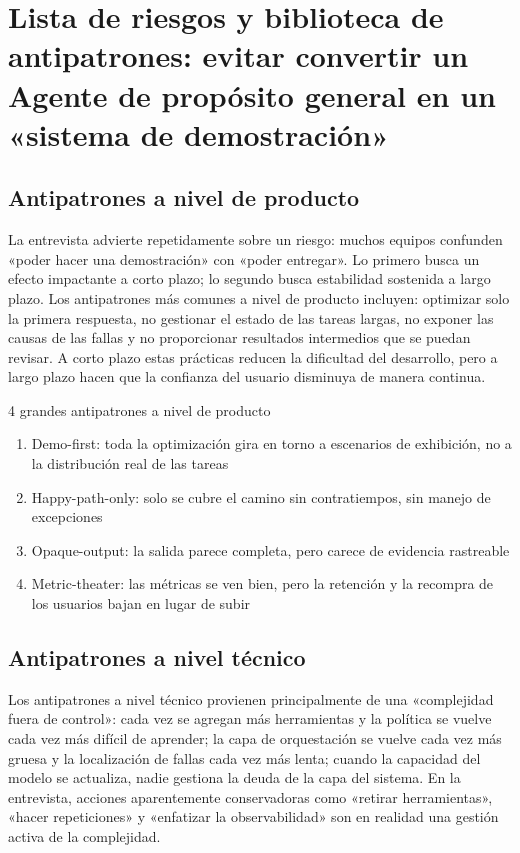 \section{Lista de riesgos y biblioteca de antipatrones: evitar convertir un Agente de propósito general en un «sistema de demostración»}

\subsection{Antipatrones a nivel de producto}

La entrevista advierte repetidamente sobre un riesgo: muchos equipos confunden «poder hacer una demostración» con «poder entregar». Lo primero busca un efecto impactante a corto plazo; lo segundo busca estabilidad sostenida a largo plazo. Los antipatrones más comunes a nivel de producto incluyen: optimizar solo la primera respuesta, no gestionar el estado de las tareas largas, no exponer las causas de las fallas y no proporcionar resultados intermedios que se puedan revisar. A corto plazo estas prácticas reducen la dificultad del desarrollo, pero a largo plazo hacen que la confianza del usuario disminuya de manera continua.

\begin{warningbox}{4 grandes antipatrones a nivel de producto}
\begin{enumerate}
    \item Demo-first: toda la optimización gira en torno a escenarios de exhibición, no a la distribución real de las tareas
    \item Happy-path-only: solo se cubre el camino sin contratiempos, sin manejo de excepciones
    \item Opaque-output: la salida parece completa, pero carece de evidencia rastreable
    \item Metric-theater: las métricas se ven bien, pero la retención y la recompra de los usuarios bajan en lugar de subir
\end{enumerate}
\end{warningbox}

\subsection{Antipatrones a nivel técnico}

Los antipatrones a nivel técnico provienen principalmente de una «complejidad fuera de control»: cada vez se agregan más herramientas y la política se vuelve cada vez más difícil de aprender; la capa de orquestación se vuelve cada vez más gruesa y la localización de fallas cada vez más lenta; cuando la capacidad del modelo se actualiza, nadie gestiona la deuda de la capa del sistema. En la entrevista, acciones aparentemente conservadoras como «retirar herramientas», «hacer repeticiones» y «enfatizar la observabilidad» son en realidad una gestión activa de la complejidad.

